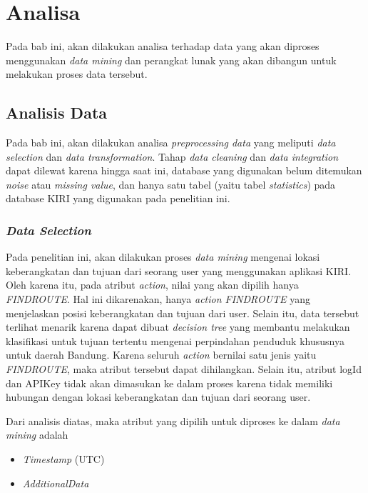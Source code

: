 \chapter{Analisa}

Pada bab ini, akan dilakukan analisa terhadap data yang akan diproses menggunakan \textsl{data mining} dan perangkat lunak yang akan dibangun untuk melakukan proses data tersebut.

\section{Analisis Data}
Pada bab ini, akan dilakukan analisa \textsl{preprocessing data} yang meliputi \textsl{data selection} dan \textsl{data transformation}. Tahap \textsl{data cleaning} dan \textsl{data integration} dapat dilewat karena hingga saat ini, database yang digunakan belum ditemukan \textsl{noise} atau \textsl{missing value}, dan hanya satu tabel (yaitu tabel \textsl{statistics}) pada database KIRI yang digunakan pada penelitian ini.

\subsection{\textsl{Data Selection}}
Pada penelitian ini, akan dilakukan proses \textsl{data mining} mengenai lokasi keberangkatan dan tujuan dari seorang user yang menggunakan aplikasi KIRI. Oleh karena itu, pada atribut \textsl{action}, nilai yang akan dipilih hanya \textsl{FINDROUTE}. Hal ini dikarenakan, hanya \textsl{action FINDROUTE} yang menjelaskan posisi keberangkatan dan tujuan dari user. Selain itu, data tersebut terlihat menarik karena dapat dibuat \textsl{decision tree} yang membantu melakukan klasifikasi untuk tujuan tertentu mengenai perpindahan penduduk khususnya untuk daerah Bandung. Karena seluruh \textsl{action} bernilai satu jenis yaitu \textsl{FINDROUTE}, maka atribut tersebut dapat dihilangkan. Selain itu, atribut logId dan APIKey tidak akan dimasukan ke dalam proses karena tidak memiliki hubungan dengan lokasi keberangkatan dan tujuan dari seorang user.

Dari analisis diatas, maka atribut yang dipilih untuk diproses ke dalam \textsl{data mining} adalah
\begin{itemize}
	\item \textsl{Timestamp} (UTC)
	\item \textsl{AdditionalData}
\end{itemize}

